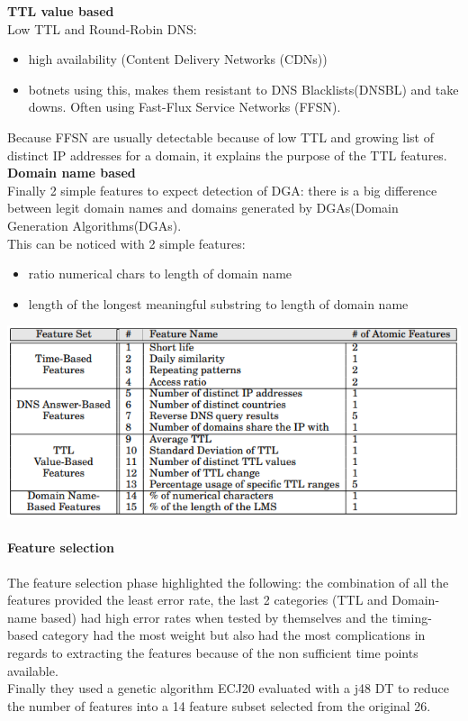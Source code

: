 \textbf{TTL value based}\\
Low TTL and Round-Robin DNS: \\
\begin{itemize}[noitemsep]
\item high availability (Content Delivery Networks (CDNs))
\item botnets using this, makes them resistant to DNS Blacklists(DNSBL) and take downs. Often using Fast-Flux Service Networks (FFSN).
\end{itemize}
Because FFSN are usually detectable because of low TTL and growing list of distinct IP addresses for a domain, it explains the purpose of the TTL features.
\textbf{Domain name based}\\
Finally 2 simple features to expect detection of DGA: there is a big difference between legit domain names and domains generated by DGAs(Domain Generation Algorithms(DGAs).\\
This can be noticed with 2 simple features:\\
\begin{itemize}[noitemsep]
\item ratio numerical chars to length of domain name
\item length of the longest meaningful substring to length of domain name
\end{itemize}

\includegraphics[scale=.5]{img/exposure_all_features.png}

\paragraph{Feature selection}
The feature selection phase highlighted the following: the combination of all the features provided the least error rate, the last 2 categories (TTL and Domain-name based) had high error rates when tested by themselves and the timing-based category had the most weight but also had the most complications in regards to extracting the features because of the non sufficient time points available. \\
Finally they used a genetic algorithm ECJ20 evaluated with a j48 DT to reduce the number of features into a 14 feature subset selected from the original 26.

